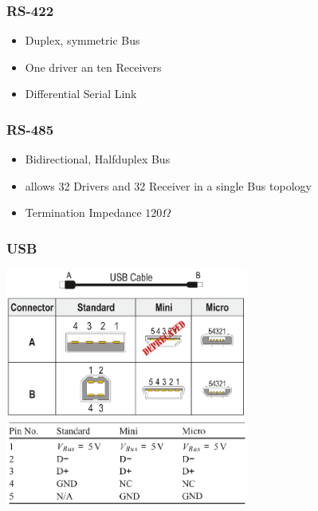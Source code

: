 \subsubsection{RS-422}
\begin{itemize}
	\item Duplex, symmetric Bus
	\item One driver an ten Receivers
	\item Differential Serial Link
\end{itemize}
\subsubsection{RS-485}
\begin{itemize}
	\item Bidirectional, Halfduplex Bus
	\item allows 32 Drivers and 32 Receiver in a single Bus topology
	\item Termination Impedance $120 \Omega$
\end{itemize}
\subsubsection{USB}
\begin{multicols}{2}
	\includegraphics[width=8cm]{images/usb_jacks.png}\\
	\includegraphics[width=8cm]{images/usb_voltage.png}\\
\end{multicols}
